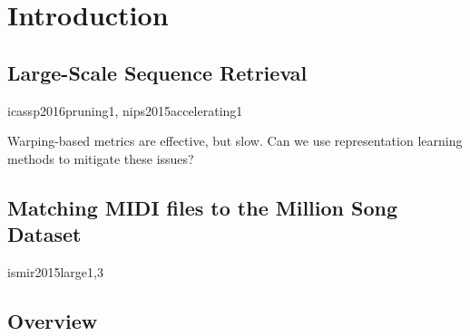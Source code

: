 \chapter{Introduction}

\cite{}

\section{Large-Scale Sequence Retrieval}

icassp2016pruning1, nips2015accelerating1

Warping-based metrics are effective, but slow.
Can we use representation learning methods to mitigate these issues?

\section{Matching MIDI files to the Million Song Dataset}

ismir2015large1,3

\section{Overview}
